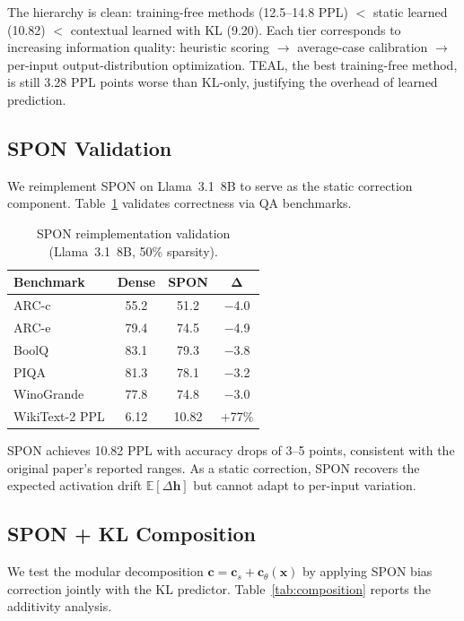 \documentclass[11pt,a4paper]{article}
\begin{document}
The hierarchy is clean: training-free methods (12.5--14.8 PPL) $<$ static learned (10.82) $<$ contextual learned with KL (9.20).
Each tier corresponds to increasing information quality: heuristic scoring $\to$ average-case calibration $\to$ per-input output-distribution optimization.
TEAL, the best training-free method, is still 3.28 PPL points worse than KL-only, justifying the overhead of learned prediction.

\subsection{SPON Validation}
\label{sec:spon}

We reimplement SPON on Llama~3.1~8B to serve as the static correction component.
Table~\ref{tab:spon} validates correctness via QA benchmarks.

\begin{table}[t]
\centering
\small
\caption{SPON reimplementation validation (Llama~3.1~8B, 50\% sparsity).}
\label{tab:spon}
\begin{tabular}{lccc}
\toprule
\textbf{Benchmark} & \textbf{Dense} & \textbf{SPON} & $\boldsymbol{\Delta}$ \\
\midrule
ARC-c & 55.2 & 51.2 & $-$4.0 \\
ARC-e & 79.4 & 74.5 & $-$4.9 \\
BoolQ & 83.1 & 79.3 & $-$3.8 \\
PIQA & 81.3 & 78.1 & $-$3.2 \\
WinoGrande & 77.8 & 74.8 & $-$3.0 \\
\midrule
WikiText-2 PPL & 6.12 & 10.82 & +77\% \\
\bottomrule
\end{tabular}
\end{table}

SPON achieves 10.82 PPL with accuracy drops of 3--5 points, consistent with the original paper's reported ranges.
As a static correction, SPON recovers the expected activation drift $\mathbb{E}[\Delta\mathbf{h}]$ but cannot adapt to per-input variation.

\subsection{SPON + KL Composition}
\label{sec:composition}

We test the modular decomposition $\mathbf{c} = \mathbf{c}_s + \mathbf{c}_\theta(\mathbf{x})$ by applying SPON bias correction jointly with the KL predictor.
Table~\ref{tab:composition} reports the additivity analysis.
\end{document}
